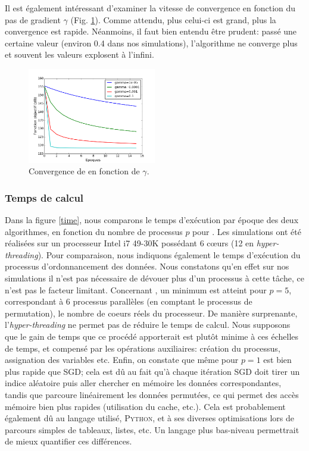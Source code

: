 \documentclass[10pt,a4paper]{article}
\begin{document}
Il est également intéressant d'examiner la vitesse de convergence en fonction du pas de gradient $\gamma$ (Fig. \ref{obj_gamma}). Comme attendu, plus celui-ci est grand, plus la convergence est rapide. Néanmoins, il faut bien entendu être prudent: passé une certaine valeur (environ 0.4 dans nos simulations), l'algorithme ne converge plus et souvent les valeurs explosent à l'infini.

\begin{figure}
\centering
\includegraphics[width=0.5\textwidth]{fig/obj_gamma}
\caption{Convergence de \jel en fonction de $\gamma$.}
\label{obj_gamma}
\end{figure}

\subsubsection*{Temps de calcul}
Dans la figure \ref{time}, nous comparons le temps d'exécution par époque des deux algorithmes, en fonction du nombre de processus $p$ pour \jel. Les simulations ont été réalisées sur un processeur Intel i7 49-30K possédant 6 cœurs (12 en \emph{hyper-threading}). Pour comparaison, nous indiquons également le temps d'exécution du processus d'ordonnancement des données. Nous constatons qu'en effet sur nos simulations il n'est pas nécessaire de dévouer plus d'un processus à cette tâche, ce n'est pas le facteur limitant. Concernant \jel, un minimum est atteint pour $p=5$, correspondant à $6$ processus parallèles (en comptant le processus de permutation), le nombre de coeurs réels du processeur. De manière surprenante, l'\emph{hyper-threading} ne permet pas de réduire le temps de calcul. Nous supposons que le gain de temps que ce procédé apporterait est plutôt minime à ces échelles de temps, et compensé par les opérations auxiliaires: création du processus, assignation des variables etc. Enfin, on constate que même pour $p=1$ \jel est bien plus rapide que SGD; cela est dû au fait qu'à chaque itération SGD doit tirer un indice aléatoire puis aller chercher en mémoire les données correspondantes, tandis que \jel parcoure linéairement les données permutées, ce qui permet des accès mémoire bien plus rapides (utilisation du cache, etc.). Cela est probablement également dû au langage utilisé, \textsc{Python}, et à ses diverses optimisations lors de parcours simples de tableaux, listes, etc. Un langage plus bas-niveau permettrait de mieux quantifier ces différences.
\end{document}
